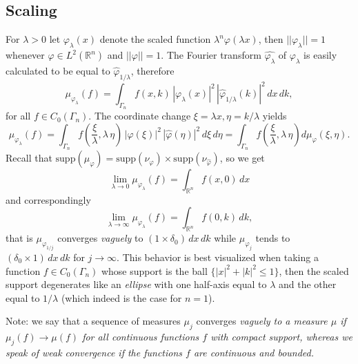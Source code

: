\documentclass[12pt,a4paper,draft]{article}
\newcommand{\RR}[1]{\mathbb{R}^#1}
\begin{document}
\subsection{Scaling}
For $\lambda>0$ let $\varphi_{\lambda}(x)$ denote the scaled function 
$\lambda^n \varphi(\lambda x)$, then $||\varphi_{\lambda}||=1$ whenever 
$\varphi\in L^2(\RR n)$ and $||\varphi||=1$. The Fourier transform 
$\widehat{\varphi_{\lambda}}$ of $\varphi_{\lambda}$ is easily calculated
to be equal to $\hat{\varphi}_{1/\lambda}$, therefore 
\begin{equation}
    \mu_{\varphi_{\lambda}}(f) = \int_{\Gamma_n} f(x,k) 
       \,|\varphi_{\lambda}(x)|^2 \, |\hat{\varphi}_{1/\lambda}(k)|^2 \,
       dx\,dk,
\end{equation}
for all $f\in C_0(\Gamma_n)$. The coordinate change $\xi=\lambda x, 
\eta=k/\lambda$ yields
\begin{equation}
    \mu_{\varphi_{\lambda}}(f) = \int_{\Gamma_n} f(\frac{\xi}{\lambda},
      \lambda\,\eta) 
       \,|\varphi(\xi)|^2 \, |\hat{\varphi}(\eta)|^2 \,
       d\xi\,d\eta = \int_{\Gamma_n}  f(\frac{\xi}{\lambda},
      \lambda\,\eta) d\mu_{\varphi}(\xi,\eta).
\end{equation}
Recall that $\mathrm{supp}(\mu_{\varphi})=
  \mathrm{supp}(\nu_{\varphi})\times \mathrm{supp}(\nu_{\hat\varphi})$, so we
get 
\begin{equation}
     \lim_{\lambda\rightarrow 0}  \mu_{\varphi_{\lambda}}(f)  =
       \int_{\RR n} f(x,0)\,dx
\end{equation}
and correspondingly
\begin{equation}
      \lim_{\lambda\rightarrow \infty}  \mu_{\varphi_{\lambda}}(f)  =
       \int_{\RR n} f(0,k)\,dk,
\end{equation}
that is $\mu_{\varphi_{1/j}}$ converges {\sl vaguely} 
to $(1\times\delta_0)\,dx\,dk$
while $\mu_{\varphi_{j}}$ tends to $(\delta_0\times 1)\,dx\,dk$ for 
$j\rightarrow \infty$. This behavior is best visualized when taking a function
$f\in C_0(\Gamma_n)$ whose support is the ball $\{|x|^2+|k|^2\leq 1\}$, then
the scaled support degenerates like an {\sl ellipse} with one half-axis equal to 
$\lambda$ and the other equal to $1/\lambda$ (which indeed is the case for $n=1$). 

Note: we say that a sequence of measures $\mu_{j}$ converges \sl vaguely
to a measure $\mu$ if $\mu_{j}(f)\rightarrow \mu(f)$ for all continuous
functions $f$ with compact support, whereas we speak of {\sl weak convergence}
if the functions $f$ are continuous and bounded.
\end{document}
